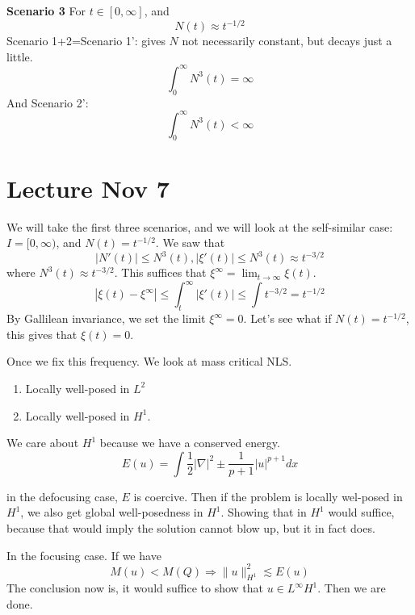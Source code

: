 \textbf{Scenario 3}
For $t\in [0,\infty]$, and 
\begin{equation*}
    N(t)\approx t^{-1/2}
\end{equation*}
Scenario 1+2=Scenario 1': gives $N$ not necessarily constant, but decays just a little.
\begin{equation*}
    \int_0^\infty N^3(t)=\infty
\end{equation*}
And Scenario 2':
\begin{equation*}
    \int_0^\infty N^3(t)<\infty
\end{equation*}

\section{Lecture Nov 7}
We will take the first three scenarios, and we will look at the self-similar case: $I=[0,\infty)$, and $N(t)=t^{-1/2}$.
We saw that 
\begin{equation*}
    |N'(t)|\leq N^3(t), |\xi'(t)|\leq N^3(t)\approx t^{-3/2}
\end{equation*}
where $N^3(t)\approx t^{-3/2}$. This suffices that $\xi^\infty=\lim_{t\to\infty}\xi(t)$.
\begin{equation*}
    |\xi(t)-\xi^\infty|\leq\int_t^\infty|\xi'(t)|\leq\int t^{-3/2}=t^{-1/2}
\end{equation*}
By Gallilean invariance, we set the limit $\xi^\infty=0$. Let's see what if $N(t)=t^{-1/2}$, this gives that $\xi(t)=0$.

Once we fix this frequency. We look at mass critical NLS. 
\begin{enumerate}
    \item Locally well-posed in $L^2$
    \item Locally well-posed in $H^1$.
\end{enumerate}
\begin{note}
    We care about $H^1$ because we have a conserved energy.
    \begin{equation*}
        E(u)=\int \frac{1}{2}|\nabla|^2\pm\frac{1}{p+1}|u|^{p+1}dx
    \end{equation*}
\end{note}
in the defocusing case, $E$ is coercive. Then if the problem is locally wel-posed in $H^1$, we also get global well-posedness in $H^1$.
Showing that in $H^1$ would suffice, because that would imply the solution cannot blow up, but it in fact does.

In the focusing case. If we have 
\begin{equation*}
    M(u)<M(Q)\Rightarrow \|u\|_{H^1}^2\lesssim E(u)
\end{equation*}
The conclusion now is, it would suffice to show that $u\in L^\infty H^1$. Then we are done.


